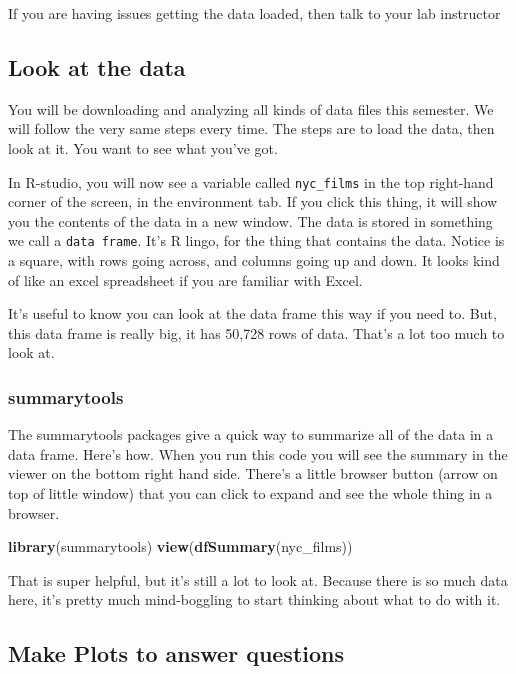 \documentclass[]{book}
\newenvironment{Shaded}{\begin{snugshade}}{\end{snugshade}}
\newcommand{\KeywordTok}[1]{\textcolor[rgb]{0.13,0.29,0.53}{\textbf{#1}}}
\newcommand{\NormalTok}[1]{#1}
\begin{document}
If you are having issues getting the data loaded, then talk to your lab
instructor

\subsection{Look at the data}\label{look-at-the-data}

You will be downloading and analyzing all kinds of data files this
semester. We will follow the very same steps every time. The steps are
to load the data, then look at it. You want to see what you've got.

In R-studio, you will now see a variable called \texttt{nyc\_films} in
the top right-hand corner of the screen, in the environment tab. If you
click this thing, it will show you the contents of the data in a new
window. The data is stored in something we call a \texttt{data\ frame}.
It's R lingo, for the thing that contains the data. Notice is a square,
with rows going across, and columns going up and down. It looks kind of
like an excel spreadsheet if you are familiar with Excel.

It's useful to know you can look at the data frame this way if you need
to. But, this data frame is really big, it has 50,728 rows of data.
That's a lot too much to look at.

\subsubsection{summarytools}\label{summarytools}

The summarytools packages give a quick way to summarize all of the data
in a data frame. Here's how. When you run this code you will see the
summary in the viewer on the bottom right hand side. There's a little
browser button (arrow on top of little window) that you can click to
expand and see the whole thing in a browser.

\begin{Shaded}
\begin{Highlighting}[]
\KeywordTok{library}\NormalTok{(summarytools)}
\KeywordTok{view}\NormalTok{(}\KeywordTok{dfSummary}\NormalTok{(nyc_films))}
\end{Highlighting}
\end{Shaded}

That is super helpful, but it's still a lot to look at. Because there is
so much data here, it's pretty much mind-boggling to start thinking
about what to do with it.

\subsection{Make Plots to answer
questions}\label{make-plots-to-answer-questions}
\end{document}

